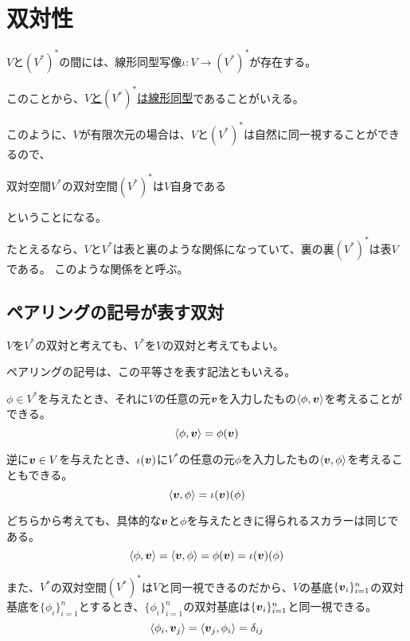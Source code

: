 \documentclass[../../../topic_linear-algebra]{subfiles}
\begin{document}
\sectionline
\section{双対性}

$V$と$(V^*)^*$の間には、線形同型写像$\iota \colon V \to (V^*)^*$が存在する。

このことから、\hyperref[def:linear-subspace-isomorphism]{$V$と$(V^*)^*$は線形同型}であることがいえる。

\br

このように、$V$が有限次元の場合は、$V$と$(V^*)^*$は自然に同一視することができるので、
\begin{emphabox}
  \begin{spacebox}
    \begin{center}
      双対空間$V^*$の双対空間$(V^*)^*$は$V$自身である
    \end{center}
  \end{spacebox}
\end{emphabox}
ということになる。

\br

たとえるなら、$V$と$V^*$は表と裏のような関係になっていて、裏の裏$(V^*)^*$は表$V$である。
このような関係をと呼ぶ。

\subsection{ペアリングの記号が表す双対}

$V$を$V^*$の双対と考えても、$V^*$を$V$の双対と考えてもよい。

ペアリングの記号は、この平等さを表す記法ともいえる。

\br

$\phi \in V^*$を与えたとき、それに$V$の任意の元$\vb*{v}$を入力したもの$\langle \phi, \vb*{v} \rangle$を考えることができる。
\begin{equation*}
  \langle \phi, \vb*{v} \rangle = \phi(\vb*{v})
\end{equation*}

逆に$\vb*{v} \in V$を与えたとき、$\iota(\vb*{v})$に$V^*$の任意の元$\phi$を入力したもの$\langle \vb*{v}, \phi \rangle$を考えることもできる。
\begin{equation*}
  \langle \vb*{v}, \phi \rangle = \iota(\vb*{v})(\phi)
\end{equation*}

\br

どちらから考えても、具体的な$\vb*{v}$と$\phi$を与えたときに得られるスカラーは同じである。
\begin{equation*}
  \langle \phi, \vb*{v} \rangle = \langle \vb*{v}, \phi \rangle = \phi(\vb*{v}) = \iota(\vb*{v})(\phi)
\end{equation*}

\br

また、$V^*$の双対空間$(V^*)^*$は$V$と同一視できるのだから、$V$の基底$\{ \vb*{v}_i \}_{i=1}^n$の双対基底を$\{ \phi_i \}_{i=1}^n$とするとき、$\{ \phi_i \}_{i=1}^n$の双対基底は$\{ \vb*{v}_i \}_{i=1}^n$と同一視できる。
\begin{equation*}
  \langle \phi_i, \vb*{v}_j \rangle = \langle \vb*{v}_j, \phi_i \rangle = \delta_{ij}
\end{equation*}
\end{document}
